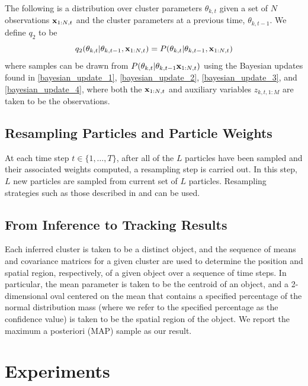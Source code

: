 \documentclass[twocolumn, final]{svjour3}
\begin{document}
The following is a distribution over cluster parameters $\theta_{k,t}$ given a set of $N$ observations $\bold{x}_{1:N, t}$ and the cluster parameters at a previous time, $\theta_{k,t-1}$. We define $q_{2}$ to be
\begin{equation}
\label{smc_q2_eqn}
q_{2}(\theta_{k,t} | \theta_{k,t-1}, \bold{x}_{1:N,t}) = P(\theta_{k,t} | \theta_{k,t-1}, \bold{x}_{1:N,t})
\end{equation}
where samples can be drawn from $P(\theta_{k,t} | \theta_{k,t-1} \bold{x}_{1:N,t})$ using the Bayesian updates found in \eqref{bayesian_update_1}, \eqref{bayesian_update_2}, \eqref{bayesian_update_3}, and \eqref{bayesian_update_4}, where both the $\bold{x}_{1:N,t}$ and auxiliary variables $z_{k,t,1:M}$ are taken to be the observations.


\subsection{Resampling Particles and Particle Weights}
\label{sec:resample}

At each time step $t \in \{ 1, \ldots, T \}$, after all of the $L$ particles have been sampled and their associated weights computed, a resampling step is carried out. In this step, $L$ new particles are sampled from current set of $L$ particles.
Resampling strategies such as those described in \cite{gasthaus_thesis} and \cite{douc2005comparison} can be used.


\subsection{From Inference to Tracking Results}
\label{sec:inferencetotrackingresults}
 
Each inferred cluster is taken to be a distinct object, and the sequence of means and covariance matrices for a given cluster are used to determine the position and spatial region, respectively, of a given object over a sequence of time steps. In particular, the mean parameter is taken to be the centroid of an object, and a 2-dimensional oval centered on the mean that contains a specified percentage of the normal distribution mass (where we refer to the specified percentage as the confidence value) is taken to be the spatial region of the object. We report the maximum a posteriori (MAP) sample as our result.



\section{Experiments}
\label{sec:experiments}
\end{document}
